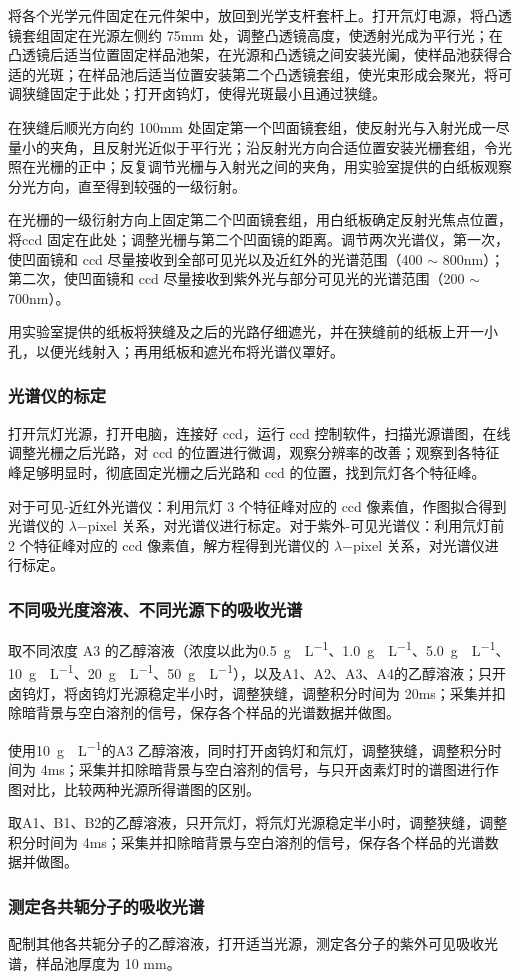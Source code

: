 将各个光学元件固定在元件架中，放回到光学支杆套杆上。打开氘灯电源，将凸透镜套组固定在光源左侧约 75\si{mm} 处，调整凸透镜高度，使透射光成为平行光；在凸透镜后适当位置固定样品池架，在光源和凸透镜之间安装光阑，使样品池获得合适的光斑；在样品池后适当位置安装第二个凸透镜套组，使光束形成会聚光，将可调狭缝固定于此处；打开卤钨灯，使得光斑最小且通过狭缝。

在狭缝后顺光方向约 100\si{mm} 处固定第一个凹面镜套组，使反射光与入射光成一尽量小的夹角，且反射光近似于平行光；沿反射光方向合适位置安装光栅套组，令光照在光栅的正中；反复调节光栅与入射光之间的夹角，用实验室提供的白纸板观察分光方向，直至得到较强的一级衍射。

在光栅的一级衍射方向上固定第二个凹面镜套组，用白纸板确定反射光焦点位置，将ccd 固定在此处；调整光栅与第二个凹面镜的距离。调节两次光谱仪，第一次，使凹面镜和 ccd 尽量接收到全部可见光以及近红外的光谱范围（400 $\sim$ 800\si{nm}）；第二次，使凹面镜和 ccd 尽量接收到紫外光与部分可见光的光谱范围（200 $\sim$ 700\si{nm}）。

用实验室提供的纸板将狭缝及之后的光路仔细遮光，并在狭缝前的纸板上开一小孔，以便光线射入；再用纸板和遮光布将光谱仪罩好。

\subsubsection{光谱仪的标定}

打开氘灯光源，打开电脑，连接好 ccd，运行 ccd 控制软件，扫描光源谱图，在线调整光栅之后光路，对 ccd 的位置进行微调，观察分辨率的改善；观察到各特征峰足够明显时，彻底固定光栅之后光路和 ccd 的位置，找到氘灯各个特征峰。

对于可见-近红外光谱仪：利用氘灯 3 个特征峰对应的 ccd 像素值，作图拟合得到光谱仪的 $\lambda$−pixel 关系，对光谱仪进行标定。对于紫外-可见光谱仪：利用氘灯前 2 个特征峰对应的 ccd 像素值，解方程得到光谱仪的 $\lambda$−pixel 关系，对光谱仪进行标定。

\subsubsection{不同吸光度溶液、不同光源下的吸收光谱}

取不同浓度 A3 的乙醇溶液（浓度以此为0.5\si{\mu g\cdot L^{-1}}、1.0\si{\mu g\cdot L^{-1}}、5.0\si{\mu g\cdot L^{-1}}、10\si{\mu g\cdot L^{-1}}、20\si{\mu g\cdot L^{-1}}、50\si{\mu g\cdot L^{-1}}），以及A1、A2、A3、A4的乙醇溶液；只开卤钨灯，将卤钨灯光源稳定半小时，调整狭缝，调整积分时间为 20\si{ms}；采集并扣除暗背景与空白溶剂的信号，保存各个样品的光谱数据并做图。

使用10\si{\mu g\cdot L^{-1}}的A3 乙醇溶液，同时打开卤钨灯和氘灯，调整狭缝，调整积分时间为 4\si{ms}；采集并扣除暗背景与空白溶剂的信号，与只开卤素灯时的谱图进行作图对比，比较两种光源所得谱图的区别。

取A1、B1、B2的乙醇溶液，只开氘灯，将氘灯光源稳定半小时，调整狭缝，调整积分时间为 4\si{ms}；采集并扣除暗背景与空白溶剂的信号，保存各个样品的光谱数据并做图。

\subsubsection{测定各共轭分子的吸收光谱} 

配制其他各共轭分子的乙醇溶液，打开适当光源，测定各分子的紫外可见吸收光谱，样品池厚度为 10 mm。

